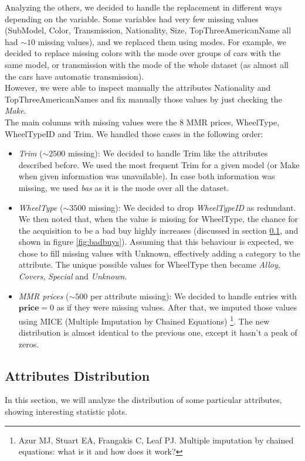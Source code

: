 \documentclass{article}
\begin{document}
	
	Analyzing the others, we decided to handle the replacement in different ways depending on the variable.
	Some variables had very few missing values (SubModel, Color, Transmission, Nationality, Size, TopThreeAmericanName all had $\sim 10$ missing values), and we replaced them using modes. For example, we decided to replace missing colors with the mode over groups of cars with the same model, or transmission with the mode of the whole dataset (as almost all the cars have automatic transmission).\\ However, we were able to inspect manually the attributes Nationality and TopThreeAmericanNames and fix manually those values by just checking the \emph{Make}.\\
	The main columns with missing values were the 8 MMR prices, WheelType, WheelTypeID and Trim.
	We handled those cases in the following order:
	\begin{itemize}
		\item \emph{Trim} ($\sim 2500$ missing): We decided to handle Trim like the attributes described before. We used the most frequent Trim for a given model (or Make when given information was unavailable). In case both information was missing, we used \emph{bas} as it is the mode over all the dataset.
		\item \emph{WheelType} ($\sim 3500$ missing): We decided to drop \emph{WheelTypeID} as redundant. We then noted that, when the value is missing for WheelType, the chance for the acquisition to be a bad buy highly increases (discussed in section \ref{sec:attrDistr}, and shown in figure \ref{fig:badbuys}). Assuming that this behaviour is expected, we chose to fill missing values with Unknown, effectively adding a category to the attribute. The unique possible values for WheelType then became \emph{Alloy}, \emph{Covers}, \emph{Special} and \emph{Unknown}.
		\item \emph{MMR prices} ($\sim 500$ per attribute missing): We decided to handle entries with $\mathbf{price} = 0$ as if they were missing values. After that, we imputed those values using MICE (Multiple Imputation by Chained Equations) \footnote{Azur MJ, Stuart EA, Frangakis C, Leaf PJ. Multiple imputation by chained equations: what is it and how does it work?}. The new distribution is almost identical to the previous one, except it hasn't a peak of zeros. 
	\end{itemize}
	
	
	
	\subsection{Attributes Distribution}
	\label{sec:attrDistr}
	In this section, we will analyze the distribution of some particular attributes, showing interesting statistic plots.
	
\end{document}
